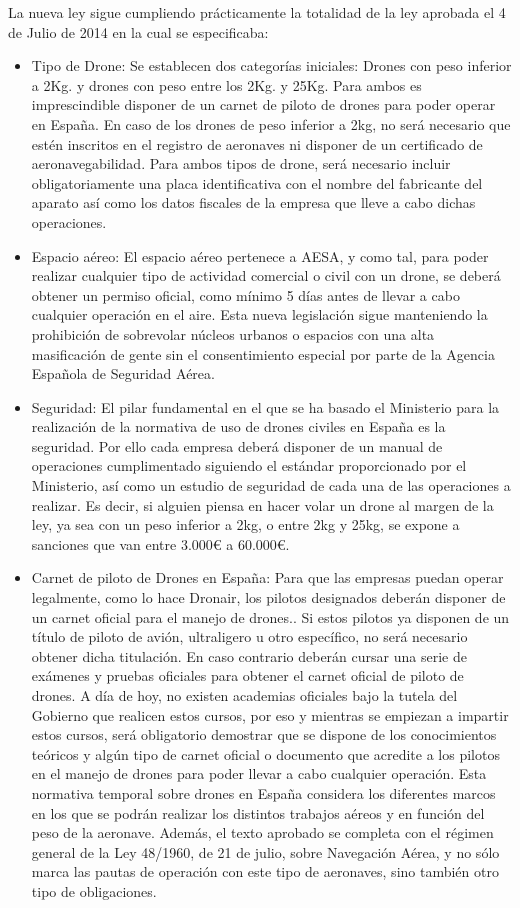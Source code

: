 \hspace{1cm} La nueva ley sigue cumpliendo prácticamente la totalidad de la ley aprobada el 4 de Julio de 2014 en la cual se especificaba: 
\begin{itemize}
		\item Tipo de Drone: Se establecen dos categorías iniciales: Drones con peso inferior a 2Kg. y drones con peso entre los 2Kg. y 25Kg. Para ambos es imprescindible disponer de un carnet de piloto de drones para poder operar en España. En caso de los drones de peso inferior a 2kg, no será necesario que estén inscritos en el registro de aeronaves ni disponer de un certificado de aeronavegabilidad. Para ambos tipos de drone, será necesario incluir obligatoriamente una placa identificativa con el nombre del fabricante del aparato así como los datos fiscales de la empresa que lleve a cabo dichas operaciones.
		\item Espacio aéreo: El espacio aéreo pertenece a AESA, y como tal, para poder realizar cualquier tipo de actividad comercial o civil con un drone, se deberá obtener un permiso oficial, como mínimo 5 días antes de llevar a cabo cualquier operación en el aire. Esta nueva legislación sigue manteniendo la prohibición de sobrevolar núcleos urbanos o espacios con una alta masificación de gente sin el consentimiento especial por parte de la Agencia Española de Seguridad Aérea.
		\item Seguridad: El pilar fundamental en el que se ha basado el Ministerio para la realización de la normativa de uso de drones civiles en España es la seguridad. Por ello cada empresa deberá disponer de un manual de operaciones cumplimentado siguiendo el estándar proporcionado por el Ministerio, así como un estudio de seguridad de cada una de las operaciones a realizar. Es decir, si alguien piensa en hacer volar un drone al margen de la ley, ya sea con un peso inferior a 2kg, o entre 2kg y 25kg, se expone a sanciones que van entre 3.000\textup{\euro} a 60.000\textup{\euro}.
		\item Carnet de piloto de Drones en España: Para que las empresas puedan operar legalmente, como lo hace Dronair, los pilotos designados deberán disponer de un carnet oficial para el manejo de drones.. Si estos pilotos ya disponen de un título de piloto de avión, ultraligero u otro específico, no será necesario obtener dicha titulación. En caso contrario deberán cursar una serie de exámenes y pruebas oficiales para obtener el carnet oficial de piloto de drones. A día de hoy, no existen academias oficiales bajo la tutela del Gobierno que realicen estos cursos, por eso y mientras se empiezan a impartir estos cursos, será obligatorio demostrar que se dispone de los conocimientos teóricos y algún tipo de carnet oficial o documento que acredite a los pilotos en el manejo de drones para poder llevar a cabo cualquier operación. Esta normativa temporal sobre drones en España considera los diferentes marcos en los que se podrán realizar los distintos trabajos aéreos y en función del peso de la aeronave. Además, el texto aprobado se completa con el régimen general de la Ley 48/1960, de 21 de julio, sobre Navegación Aérea, y no sólo marca las pautas de operación con este tipo de aeronaves, sino también otro tipo de obligaciones.

\end{itemize}

